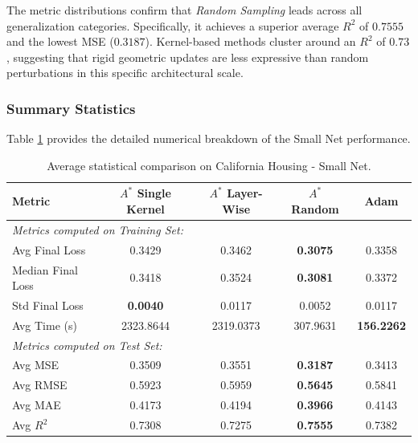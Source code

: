 The metric distributions confirm that \textit{Random Sampling} leads across all generalization categories. Specifically, it achieves a superior average $R^2$ of $0.7555$ and the lowest MSE ($0.3187$). Kernel-based methods cluster around an $R^2$ of $0.73$, suggesting that rigid geometric updates are less expressive than random perturbations in this specific architectural scale.

\subsubsection{Summary Statistics}

Table \ref{tab:small_net_california} provides the detailed numerical breakdown of the Small Net performance.

\begin{table}[htbp]
\centering
\scriptsize
\begin{tabular}{|l|c|c|c|c|}
\hline
\textbf{Metric}   & \textbf{$A^*$ Single Kernel} & \textbf{$A^*$ Layer-Wise} & \textbf{$A^*$ Random} & \textbf{Adam} \\ \hline
\multicolumn{5}{|l|}{\textit{Metrics computed on Training Set:}} \\ \hline
Avg Final Loss          & 0.3429                       & 0.3462                    & \textbf{0.3075}       & 0.3358        \\ 
Median Final Loss       & 0.3418                       & 0.3524                    & \textbf{0.3081}       & 0.3372        \\
Std Final Loss          & \textbf{0.0040}              & 0.0117                    & 0.0052                & 0.0117        \\ \hline
Avg Time (s)            & 2323.8644                    & 2319.0373                 & 307.9631              & \textbf{156.2262} \\ \hline
\multicolumn{5}{|l|}{\textit{Metrics computed on Test Set:}} \\ \hline
Avg MSE                 & 0.3509                       & 0.3551                    & \textbf{0.3187}       & 0.3413        \\ 
Avg RMSE                & 0.5923                       & 0.5959                    & \textbf{0.5645}       & 0.5841        \\ 
Avg MAE                 & 0.4173                       & 0.4194                    & \textbf{0.3966}       & 0.4143        \\ 
Avg $R^2$               & 0.7308                       & 0.7275                    & \textbf{0.7555}       & 0.7382        \\ \hline
\end{tabular}
\caption{Average statistical comparison on California Housing - Small Net.}
\label{tab:small_net_california}
\end{table}

